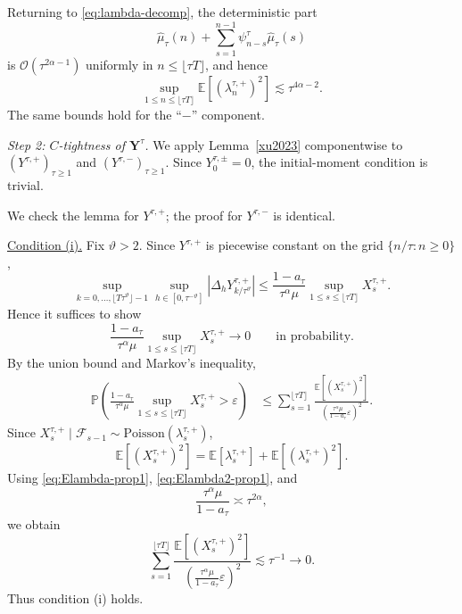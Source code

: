 \documentclass[letterpaper]{article}
\numberwithin{equation}{section}
\theoremstyle{definition}
\theoremstyle{remark}
\newcommand{\E}{\mathbb{E}}
\begin{document}
Returning to \eqref{eq:lambda-decomp}, the deterministic part
\[
  \hat\mu_\tau(n)+\sum_{s=1}^{n-1}\psi_{n-s}^\tau\hat\mu_\tau(s)
\]
is $\mathcal O(\tau^{2\alpha-1})$ uniformly in $n\le \lfloor \tau T\rfloor$, and hence
\begin{equation}\label{eq:Elambda2-prop1}
  \sup_{1\le n\le \lfloor \tau T\rfloor}\E[(\lambda_n^{\tau,+})^2]
  \lesssim \tau^{4\alpha-2}.
\end{equation}
The same bounds hold for the ``$-$'' component.

\medskip
\noindent
\textit{Step 2: $C$-tightness of $\mathbf Y^\tau$.}
We apply Lemma~\ref{xu2023} componentwise to $(Y^{\tau,+})_{\tau\ge1}$ and
$(Y^{\tau,-})_{\tau\ge1}$. Since $Y_0^{\tau,\pm}=0$, the initial-moment condition is trivial.

We check the lemma for $Y^{\tau,+}$; the proof for $Y^{\tau,-}$ is identical.

\smallskip
\noindent
\underline{Condition (i).}
Fix $\vartheta>2$. Since $Y^{\tau,+}$ is piecewise constant on the grid
$\{n/\tau:n\ge0\}$,
\[
  \sup_{k=0,\dots,\lfloor T\tau^\vartheta\rfloor-1}
  \sup_{h\in[0,\tau^{-\vartheta}]}
  \left|\Delta_hY_{k/\tau^\vartheta}^{\tau,+}\right|
  \le
  \frac{1-a_\tau}{\tau^\alpha\mu}
  \sup_{1\le s\le \lfloor \tau T\rfloor}X_s^{\tau,+}.
\]
Hence it suffices to show
\[
  \frac{1-a_\tau}{\tau^\alpha\mu}
  \sup_{1\le s\le \lfloor \tau T\rfloor}X_s^{\tau,+}\to0
  \qquad\text{in probability.}
\]
By the union bound and Markov's inequality,
\begin{align*}
  \mathbb P\!\left(
    \frac{1-a_\tau}{\tau^\alpha\mu}
    \sup_{1\le s\le \lfloor \tau T\rfloor}X_s^{\tau,+}>\varepsilon
  \right)
  &\le
  \sum_{s=1}^{\lfloor \tau T\rfloor}
  \frac{\E[(X_s^{\tau,+})^2]}
       {\left(\frac{\tau^\alpha\mu}{1-a_\tau}\varepsilon\right)^2}.
\end{align*}
Since $X_s^{\tau,+}\mid \mathcal F_{s-1}\sim \mathrm{Poisson}(\lambda_s^{\tau,+})$,
\[
  \E[(X_s^{\tau,+})^2]
  =
  \E[\lambda_s^{\tau,+}]
  +\E[(\lambda_s^{\tau,+})^2].
\]
Using \eqref{eq:Elambda-prop1}, \eqref{eq:Elambda2-prop1}, and
\[
  \frac{\tau^\alpha\mu}{1-a_\tau}\asymp \tau^{2\alpha},
\]
we obtain
\[
  \sum_{s=1}^{\lfloor \tau T\rfloor}
  \frac{\E[(X_s^{\tau,+})^2]}
       {\left(\frac{\tau^\alpha\mu}{1-a_\tau}\varepsilon\right)^2}
  \lesssim \tau^{-1}\to0.
\]
Thus condition (i) holds.
\end{document}
